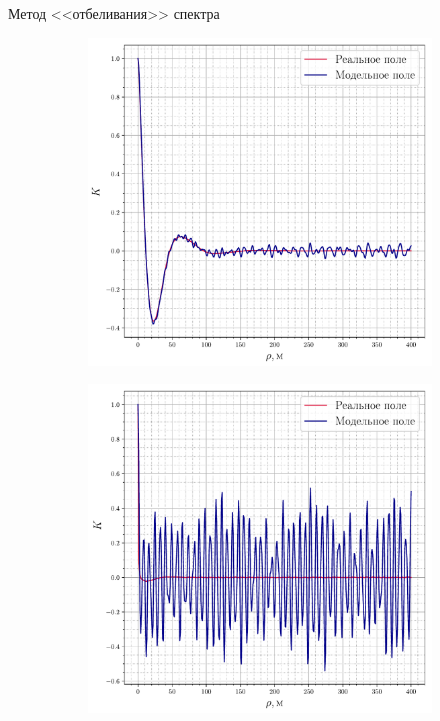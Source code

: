 \documentclass[10pt,pdf,hyperref={unicode}, dvipsnames]{beamer}
\begin{document}
\begin{frame}[t]{Метод <<отбеливания>> спектра}
    \begin{figure}[h!]
        \centering
        \begin{subfigure}{0.49\linewidth}
            \centering
            \includegraphics[width=\linewidth]{fig/correlation_height_height2.pdf}
        \end{subfigure}
        \begin{subfigure}{0.49\linewidth}
            \centering
            \includegraphics[width=\linewidth]{fig/correlation_angles_height2.pdf}
        \end{subfigure}
        \label{fig:ki}
    \end{figure}
\end{frame}
\end{document}
